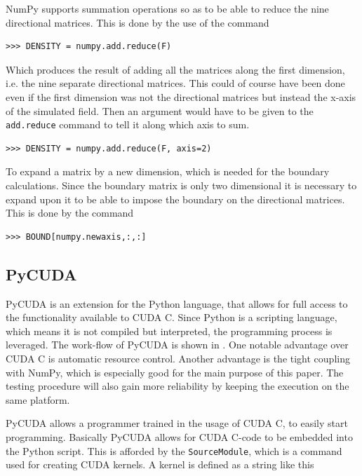 NumPy supports summation operations so as to be able to reduce the nine directional matrices. This is done by the use of the command

\begin{verbatim}
>>> DENSITY = numpy.add.reduce(F)
\end{verbatim}

Which produces the result of adding all the matrices along the first dimension, i.e. the nine separate directional matrices. This could of course have been done even if the first dimension was not the directional matrices but instead the x-axis of the simulated field. Then an argument would have to be given to the \texttt{add.reduce} command to tell it along which axis to sum.

\begin{verbatim}
>>> DENSITY = numpy.add.reduce(F, axis=2)
\end{verbatim}

To expand a matrix by a new dimension, which is needed for the boundary calculations. Since the boundary matrix is only two dimensional it is necessary to expand upon it to be able to impose the boundary on the directional matrices. This is done by the command

\begin{verbatim}
>>> BOUND[numpy.newaxis,:,:]
\end{verbatim}



\subsection{PyCUDA}
PyCUDA is an extension for the Python language, that allows for full access to the functionality available to CUDA C. Since Python is a scripting language, which means it is not compiled but interpreted, the programming process is leveraged. The work-flow of PyCUDA is shown in . One notable advantage over CUDA C is automatic resource control. Another advantage is the tight coupling with NumPy, which is especially good for the main purpose of this paper. The testing procedure will also gain more reliability by keeping the execution on the same platform.


PyCUDA allows a programmer trained in the usage of CUDA C, to easily start programming. Basically PyCUDA allows for CUDA C-code to be embedded into the Python script. This is afforded by the \texttt{SourceModule}, which is a command used for creating CUDA kernels. A kernel is defined as a string like this

